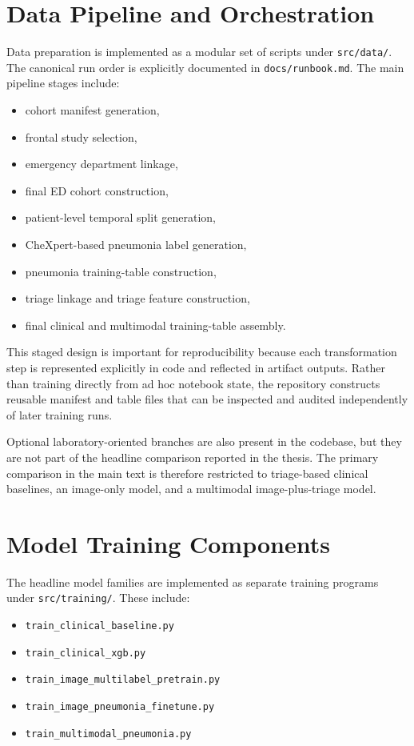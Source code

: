 \section{Data Pipeline and Orchestration}

Data preparation is implemented as a modular set of scripts under \texttt{src/data/}. The canonical run order is explicitly documented in \texttt{docs/runbook.md}. The main pipeline stages include:

\begin{itemize}
    \item cohort manifest generation,
    \item frontal study selection,
    \item emergency department linkage,
    \item final ED cohort construction,
    \item patient-level temporal split generation,
    \item CheXpert-based pneumonia label generation,
    \item pneumonia training-table construction,
    \item triage linkage and triage feature construction,
    \item final clinical and multimodal training-table assembly.
\end{itemize}

This staged design is important for reproducibility because each transformation step is represented explicitly in code and reflected in artifact outputs. Rather than training directly from ad hoc notebook state, the repository constructs reusable manifest and table files that can be inspected and audited independently of later training runs.

Optional laboratory-oriented branches are also present in the codebase, but they are not part of the headline comparison reported in the thesis. The primary comparison in the main text is therefore restricted to triage-based clinical baselines, an image-only model, and a multimodal image-plus-triage model.

\section{Model Training Components}

The headline model families are implemented as separate training programs under \texttt{src/training/}. These include:

\begin{itemize}
    \item \texttt{train\_clinical\_baseline.py}
    \item \texttt{train\_clinical\_xgb.py}
    \item \texttt{train\_image\_multilabel\_pretrain.py}
    \item \texttt{train\_image\_pneumonia\_finetune.py}
    \item \texttt{train\_multimodal\_pneumonia.py}
\end{itemize}

